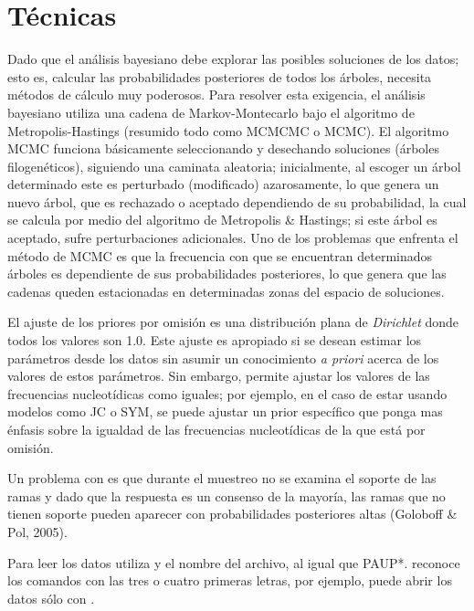\section*{T\'ecnicas}
Dado que el an\'alisis bayesiano debe explorar las posibles soluciones de los datos; esto es, calcular las probabilidades posteriores de todos los \'arboles, necesita m\'etodos de c\'alculo muy poderosos. Para resolver esta exigencia, el an\'alisis bayesiano utiliza una cadena de Markov-Montecarlo bajo el algoritmo de Metropolis-Hastings (resumido todo como MCMCMC o MCMC). El algoritmo MCMC funciona b\'asicamente seleccionando y desechando 
soluciones (\'arboles filogen\'eticos), siguiendo una caminata aleatoria; inicialmente, al escoger un \'arbol determinado este es perturbado (modificado) azarosamente, lo que genera un nuevo \'arbol, que es rechazado o aceptado dependiendo de su probabilidad, la cual se calcula por medio del algoritmo de Metropolis \& Hastings; si este \'arbol es aceptado, sufre perturbaciones adicionales. Uno de los problemas que enfrenta el m\'etodo de MCMC es que la frecuencia con que se encuentran  determinados \'arboles es dependiente de sus probabilidades posteriores, lo que genera que las cadenas queden estacionadas en determinadas zonas del espacio de soluciones.

El ajuste de los priores por omisi\'on es una distribuci\'on plana de \textit{Dirichlet} donde todos los valores son 1.0. Este ajuste es apropiado si se desean estimar los par\'ametros desde los datos sin asumir un conocimiento \textit{a priori} acerca de los valores de estos par\'ametros. Sin embargo,   permite ajustar los valores de las frecuencias nucleot\'idicas como iguales; por ejemplo, en el caso de estar usando modelos como JC o SYM, se puede ajustar un prior espec\'ifico que ponga mas \'enfasis sobre la igualdad de las frecuencias nucleot\'idicas de la que est\'a por omisi\'on.

Un problema con  es que durante el muestreo no se examina el soporte de las ramas y dado que la respuesta es un consenso de la mayor\'ia, las ramas que no tienen soporte pueden aparecer con probabilidades posteriores altas (Goloboff \& Pol, 2005).


Para leer los datos  utiliza  y el nombre del archivo, al igual que {PAUP*}.  reconoce los comandos con las tres o cuatro primeras letras, por ejemplo, puede abrir los datos s\'olo con .

